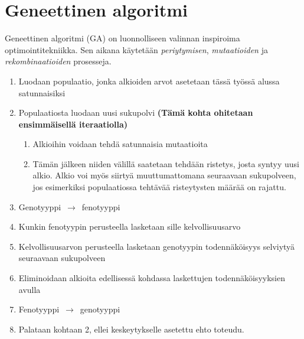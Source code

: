 \section{Geneettinen algoritmi}

Geneettinen algoritmi (GA) on luonnolliseen valinnan inspiroima optimointitekniikka.
Sen aikana käytetään \textit{periytymisen}, \textit{mutaatioiden} ja \textit{rekombinaatioiden}
prosesseja.

\begin{enumerate}
	\item Luodaan populaatio, jonka alkioiden arvot asetetaan tässä työssä alussa satunnaisiksi
	\item Populaatiosta luodaan uusi sukupolvi \textbf{(Tämä kohta ohitetaan ensimmäisellä iteraatiolla)}
	\begin{enumerate}
		\item Alkioihin voidaan tehdä satunnaisia mutaatioita
		\item Tämän jälkeen niiden välillä saatetaan tehdään ristetys, josta syntyy uusi alkio.
		Alkio voi myös siirtyä muuttumattomana seuraavaan sukupolveen, jos esimerkiksi
		populaatiossa tehtävää risteytysten määrää on rajattu.
	\end{enumerate}
	\item Genotyyppi~\(\rightarrow\)~fenotyyppi
	\item	Kunkin fenotyypin perusteella lasketaan sille kelvollisuusarvo
	\item Kelvollisuusarvon perusteella lasketaan genotyypin todennäköisyys selviytyä seuraavaan sukupolveen
	\item Eliminoidaan alkioita edellisessä kohdassa laskettujen todennäköisyyksien avulla
	\item Fenotyyppi~\(\rightarrow\)~genotyyppi
	\item Palataan kohtaan 2, ellei keskeytykselle asetettu ehto toteudu.
\end{enumerate}
